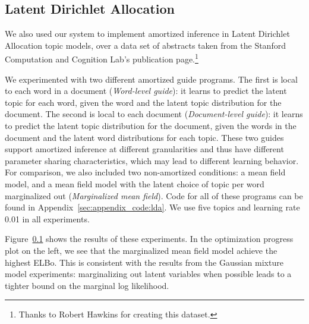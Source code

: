 %

\subsection{Latent Dirichlet Allocation}
\label{sec:results_lda}

We also used our system to implement amortized inference in Latent Dirichlet Allocation topic models, over a data set of abstracts taken from the Stanford Computation and Cognition Lab's publication page.\footnote{Thanks to Robert Hawkins for creating this dataset.}

We experimented with two different amortized guide programs.
The first is local to each word in a document (\emph{Word-level guide}): it learns to predict the latent topic for each word, given the word and the latent topic distribution for the document.
The second is local to each document (\emph{Document-level guide}): it learns to predict the latent topic distribution for the document, given the words in the document and the latent word distributions for each topic.
These two guides support amortized inference at different granularities and thus have different parameter sharing characteristics, which may lead to different learning behavior.
For comparison, we also included two non-amortized conditions: a mean field model, and a mean field model with the latent choice of topic per word marginalized out (\emph{Marginalized mean field}).
Code for all of these programs can be found in Appendix~\ref{sec:appendix_code:lda}.
We use five topics and learning rate 0.01 in all experiments.

Figure~\ref{sec:results_lda} shows the results of these experiments.
In the optimization progress plot on the left, we see that the marginalized mean field model achieve the highest ELBo.
This is consistent with the results from the Gaussian mixture model experiments: marginalizing out latent variables when possible leads to a tighter bound on the marginal log likelihood.


